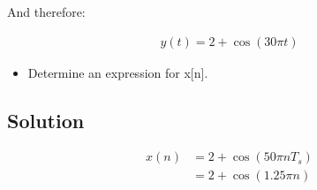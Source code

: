 And therefore:

\begin{equation*}
\begin{aligned}
y(t) = 2 + \cos(30 \pi t)
\end{aligned}
\end{equation*} 

\begin{itemize}
\item Determine an expression for x[n].
\end{itemize} 

\subsection*{Solution}

\begin{equation*}
\begin{aligned}
x(n) &= 2 + \cos(50 \pi n T_s) \\
     &= 2 + \cos(1.25 \pi n)
\end{aligned}
\end{equation*} 
